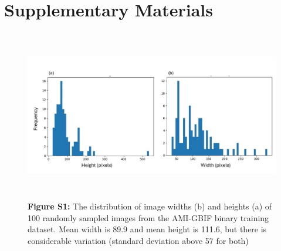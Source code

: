 \documentclass[twocolumn]{article}
\begin{document}
    \nobreak

    

\pagebreak 
\onecolumn
\section{Supplementary Materials} 

\begin{figure}[h]
        \includegraphics[width=16cm, height=7.5cm]{imgs/S_fig1.jpg}
        \captionsetup{width=0.9\textwidth}
        \caption*{\textbf{Figure S1:} The distribution of image widths (b) and heights (a)
        of 100 randomly sampled images from the AMI-GBIF binary training dataset. Mean 
        width is 89.9 and mean height is 111.6, but there is considerable variation
        (standard deviation above 57 for both)} 
\end{figure} 
\newpage 
\end{document}
